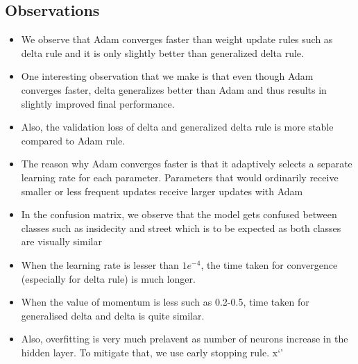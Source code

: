 \documentclass[10pt,a4paper]{article}
\begin{document}
\subsection{Observations}

\begin{itemize}
    \item We observe that Adam converges faster than weight update rules such as delta rule and it is only slightly better than generalized delta rule.
    \item One interesting observation that we make is that even though Adam converges faster, delta generalizes better than Adam and thus results in slightly improved final performance.
    \item Also, the validation loss of delta and generalized delta rule is more stable compared to Adam rule.
    \item The reason why Adam converges faster is that it adaptively selects a separate learning rate for each parameter. 
    Parameters that would ordinarily receive smaller or less frequent updates receive larger updates with Adam
    \item In the confusion matrix, we observe that the model gets confused between classes such as insidecity and street which is to be expected as both classes are
    visually similar
    \item When the learning rate is lesser than $1e^{-4}$, the time taken for convergence (especially for delta rule) is much longer.
    \item When the value of momentum is less such as 0.2-0.5, time taken for generalised delta and delta is quite similar.
    \item Also, overfitting is very much prelavent as number of neurons increase in the hidden layer. To mitigate that, we use early stopping rule. x`'

\end{itemize}
\end{document}
